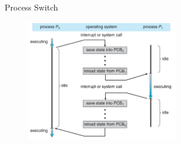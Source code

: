 \begin{frame}[fragile]{Process Switch}
	\begin{figure}[H]
		\centering
		\includegraphics[width=0.6\textwidth]{day3/img/switch1.png}
	\end{figure}
\end{frame}


